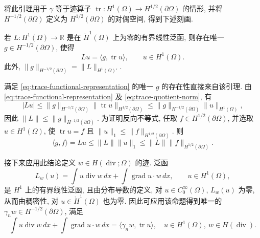 {将此引理用于 $\gamma$ 等于迹算子 $\operatorname{tr}:H^1(\Omega)\to H^{1/2}(\partial\Omega)$ 的情形, 并将 $H^{-1/2}(\partial\Omega)$ 定义为 $H^{1/2}(\partial\Omega)$ 的对偶空间, 得到下述刻画.}


\begin{Proposition}\label{prop:trace-functional-representation}
{若 $L:H^1(\Omega)\to\mathbb R$ 是在 $\mathring H^1(\Omega)$ 上为零的有界线性泛函, 则存在唯一 $g\in H^{-1/2}(\partial\Omega)$, 使得}
\begin{equation}\label{eq:trace-functional-representation}
Lu=\langle g,\operatorname{tr}u\rangle,\qquad u\in H^1(\Omega).
\end{equation}
{此外, $\|g\|_{H^{-1/2}(\partial\Omega)}=\|L\|_{H^1(\Omega)'}$.}
\end{Proposition}

\begin{Proof}
{满足 \eqref{eq:trace-functional-representation} 的唯一 $g$ 的存在性直接来自该引理. 由 \eqref{eq:trace-functional-representation} 及 \eqref{eq:trace-quotient-norm}, 有}
\[
|Lu|\leq\|g\|_{H^{-1/2}(\partial\Omega)}\|\operatorname{tr}u\|_{H^{1/2}(\partial\Omega)}\leq\|g\|_{H^{-1/2}(\partial\Omega)}\|u\|_{H^1(\Omega)},
\]
{因此 $\|L\|\leq\|g\|_{H^{-1/2}(\partial\Omega)}$. 为证明反向不等式, 任取 $f\in H^{1/2}(\partial\Omega)$, 并选取 $u\in H^1(\Omega)$, 使 $\operatorname{tr}u=f$ 且 $\|u\|_1\leq\|f\|_{H^{1/2}(\partial\Omega)}$. 则}
\[
\langle g,f\rangle=Lu\leq\|L\|\|u\|_1\leq\|L\|\|f\|_{H^{1/2}(\partial\Omega)}.
\]
\end{Proof}

{接下来应用此结论定义 $w\in H(\operatorname{div};\Omega)$ 的迹. 泛函}
\[
L_w(u)=\int u\operatorname{div}w\,dx+\int\operatorname{grad}u\cdot w\,dx,\qquad u\in H^1(\Omega),
\]
{是 $H^1$ 上的有界线性泛函, 且由分布导数的定义, 对 $u\in C_0^\infty(\Omega)$, $L_w(u)$ 为零, 从而由稠密性, 对 $u\in\mathring H^1(\Omega)$ 也为零. 因此可应用该命题得到唯一的 $\gamma_n w\in H^{-1/2}(\partial\Omega)$, 满足}
\begin{equation}\label{eq:normal-trace-green}
\int u\operatorname{div}w\,dx+\int\operatorname{grad}u\cdot w\,dx=\langle\gamma_n w,\operatorname{tr}u\rangle,\quad u\in H^1(\Omega),\ w\in H(\operatorname{div}).
\end{equation}

